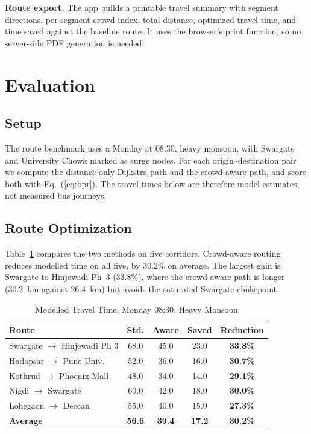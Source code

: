 \documentclass[conference]{IEEEtran}
\begin{document}
\textbf{Route export.} The app builds a printable travel summary with segment directions, per-segment crowd index, total distance, optimized travel time, and time saved against the baseline route. It uses the browser's print function, so no server-side PDF generation is needed.

\section{Evaluation}

\subsection{Setup}
The route benchmark uses a Monday at 08:30, heavy monsoon, with Swargate and University Chowk marked as surge nodes. For each origin--destination pair we compute the distance-only Dijkstra path and the crowd-aware path, and score both with Eq.~(\ref{eq:bpr}). The travel times below are therefore model estimates, not measured bus journeys.

\subsection{Route Optimization}
Table~\ref{tab:results} compares the two methods on five corridors. Crowd-aware routing reduces modelled time on all five, by 30.2\% on average. The largest gain is Swargate to Hinjewadi Ph~3 (33.8\%), where the crowd-aware path is longer (30.2~km against 26.4~km) but avoids the saturated Swargate chokepoint.

\begin{table}[h]
\caption{Modelled Travel Time, Monday 08:30, Heavy Monsoon}
\label{tab:results}
\centering
\begin{tabular}{p{2.8cm}cccc}
\toprule
\textbf{Route} & \textbf{Std.} & \textbf{Aware} & \textbf{Saved} & \textbf{Reduction} \\
\midrule
Swargate $\to$ Hinjewadi Ph 3  & 68.0 & 45.0 & 23.0 & \textbf{33.8\%} \\
Hadapsar $\to$ Pune Univ.      & 52.0 & 36.0 & 16.0 & \textbf{30.7\%} \\
Kothrud $\to$ Phoenix Mall     & 48.0 & 34.0 & 14.0 & \textbf{29.1\%} \\
Nigdi $\to$ Swargate           & 60.0 & 42.0 & 18.0 & \textbf{30.0\%} \\
Lohegaon $\to$ Deccan          & 55.0 & 40.0 & 15.0 & \textbf{27.3\%} \\
\midrule
\textbf{Average}               & \textbf{56.6} & \textbf{39.4} & \textbf{17.2} & \textbf{30.2\%} \\
\bottomrule
\end{tabular}
\end{table}
\end{document}
